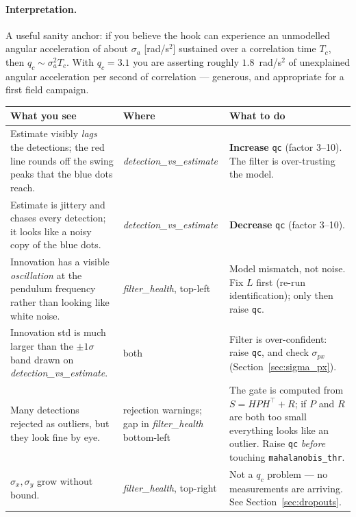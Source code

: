 \documentclass[11pt,a4paper]{article}
\newcommand{\param}[1]{\texttt{\small #1}}
\newcommand{\plot}[1]{\textit{#1}}
\begin{document}
\paragraph{Interpretation.} A useful sanity anchor: if you believe the hook can
experience an unmodelled angular acceleration of about $\sigma_a$
[rad/s$^2$] sustained over a correlation time $T_c$, then
$q_c \sim \sigma_a^2 T_c$. With $q_c=3.1$ you are asserting roughly
$1.8$~rad/s$^2$ of unexplained angular acceleration per second of correlation
--- generous, and appropriate for a first field campaign.

\begin{center}
\begin{longtable}{@{}p{6.6cm}p{3.0cm}p{5.4cm}@{}}
\toprule
\textbf{What you see} & \textbf{Where} & \textbf{What to do} \\
\midrule
\endhead
Estimate visibly \emph{lags} the detections; the red line rounds off the swing
peaks that the blue dots reach.
& \plot{detection\_vs\_estimate}
& \textbf{Increase} \param{qc} (factor 3--10). The filter is over-trusting the
model. \\

Estimate is jittery and chases every detection; it looks like a noisy copy of
the blue dots.
& \plot{detection\_vs\_estimate}
& \textbf{Decrease} \param{qc} (factor 3--10). \\

Innovation has a visible \emph{oscillation} at the pendulum frequency rather
than looking like white noise.
& \plot{filter\_health}, top-left
& Model mismatch, not noise. Fix $L$ first (re-run identification); only then
raise \param{qc}. \\

Innovation std is much larger than the $\pm1\sigma$ band drawn on
\plot{detection\_vs\_estimate}.
& both
& Filter is over-confident: raise \param{qc}, and check $\sigma_{px}$
(Section~\ref{sec:sigma_px}). \\

Many detections rejected as outliers, but they look fine by eye.
& rejection warnings; gap in \plot{filter\_health} bottom-left
& The gate is computed from $S=HPH^\top+R$; if $P$ and $R$ are both too small
everything looks like an outlier. Raise \param{qc} \emph{before} touching
\param{mahalanobis\_thr}. \\

$\sigma_x,\sigma_y$ grow without bound.
& \plot{filter\_health}, top-right
& Not a $q_c$ problem --- no measurements are arriving. See
Section~\ref{sec:dropouts}. \\
\bottomrule
\end{longtable}
\end{center}
\end{document}
